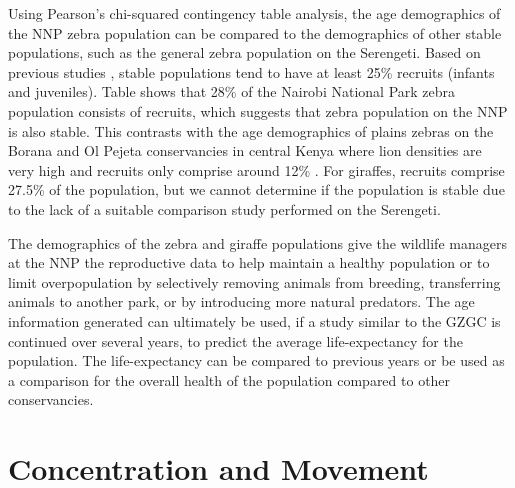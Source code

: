 Using Pearson's chi-squared \cite{plackett_karl_1983, rao_analysis_1981} contingency table analysis, the age demographics of the NNP zebra population can be compared to the demographics of other stable populations, such as the general zebra population on the Serengeti.  Based on previous studies \cite{fitzgibbon_antipredator_1995, macedo_ecology_2010, sinclair_density_1996}, stable populations tend to have at least 25\% recruits (infants and juveniles).  Table \label{tab:demographics-pz} shows that 28\% of the Nairobi National Park zebra population consists of recruits, which suggests that zebra population on the NNP is also stable. This contrasts with the age demographics of plains zebras on the Borana and Ol Pejeta conservancies in central Kenya where lion densities are very high and recruits only comprise around 12\% \cite{macedo_ecology_2010}.  For giraffes, recruits comprise 27.5\% of the population, but we cannot determine if the population is stable due to the lack of a suitable comparison study performed on the Serengeti.

The demographics of the zebra and giraffe populations give the wildlife managers at the NNP the reproductive data to help maintain a healthy population or to limit overpopulation by selectively removing animals from breeding, transferring animals to another park, or by introducing more natural predators.  The age information generated can ultimately be used, if a study similar to the GZGC is continued over several years, to predict the average life-expectancy for the population.  The life-expectancy can be compared to previous years or be used as a comparison for the overall health of the population compared to other conservancies.

\section{Concentration and Movement}

